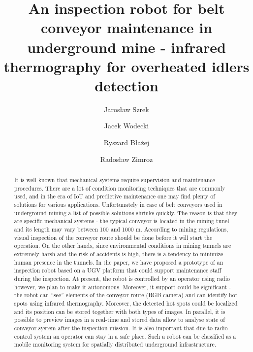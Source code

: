 \documentclass[3p,times,12pt]{elsarticle}
\begin{document}
\begin{frontmatter}

\title{ 
An inspection robot for belt conveyor maintenance in underground mine - infrared thermography for overheated idlers detection}


\author[label1]{Jaros{\l}aw Szrek}
\author[label2]{Jacek Wodecki}
\author[label2]{Ryszard B{\l}a{\.z}ej}
\author[label2]{Rados{\l}aw Zimroz}

\address[label1]{Faculty of Mechanical Engineering, Wroclaw University of Science and Technology,Wybrze{\.z}e Wyspia{\'n}skiego 27, 50-370 Wroclaw, Poland
 \\ jaroslaw.szrek@pwr.edu.pl\\}
\address[label2]{Faculty of Geoengineering, Mining and Geology, Wroclaw University of Science and Technology, Na Grobli 15, 50-421 Wroclaw, Poland
\\\{jacek.wodecki, ryszard.blazej, radoslaw.zimroz\}@pwr.edu.pl\\}
 
\begin{abstract}

It is well known that mechanical systems require supervision and maintenance procedures. There are a lot of condition monitoring techniques that are commonly used, and in the era of IoT and predictive maintenance one may find plenty of solutions for various applications. Unfortunately in case of belt conveyors  used in underground mining a list of possible solutions shrinks quickly. The reason is that they are specific mechanical systems - the typical conveyor is located in the mining tunel and its length may vary between 100 and 1000 m. According to mining regulations, visual inspection of the conveyor route should be done before it will start the operation. On the other hands, since environmental conditions in mining tunnels are extremely harsh and the risk of accidents is high, there is a tendency to minimize human presence in the tunnels. In the paper, we have proposed a prototype of an inspection robot based on a UGV platform that could support maintenance staff during the inspection. At present, the robot is controlled by an operator using radio however, we plan to make it autonomous. Moreover, it support could be significant - the robot can ”see” elements of the conveyor route (RGB camera) and can identify hot spots using infrared thermography. Moreover, the detected hot spots could be localized and its position can be stored together with both types of images. In parallel, it is possible to preview images in a real-time and stored data allow to analyse state of conveyor system after the inspection mission. It is also important that due to radio control system an operator can stay in a safe place. Such a robot can be classified as a mobile monitoring system for spatially distributed underground infrastructure.


\end{abstract}
\end{frontmatter}
\end{document}
